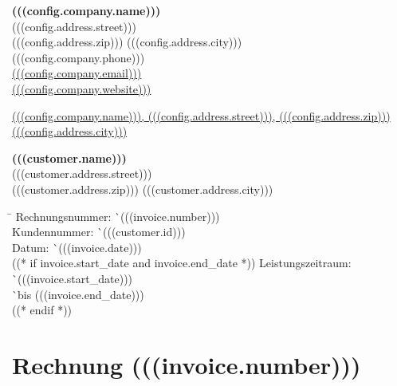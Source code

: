\documentclass[a4paper, article, oneside, hidelinks, (((config.style.font_size)))pt]{memoir}
\begin{document}
\begin{raggedleft}
	\small
	\textbf{(((config.company.name)))} \\
	(((config.address.street))) \\
	(((config.address.zip))) (((config.address.city))) \\
	(((config.company.phone))) \\
	\href{mailto:(((config.company.email)))}{(((config.company.email)))} \\
	\href{https://(((config.company.website)))}{(((config.company.website)))} \\
\end{raggedleft}

\vspace{1cm}

\begin{minipage}[t]{0.6\textwidth}
	{\scriptsize \underline{(((config.company.name))), (((config.address.street))), (((config.address.zip))) (((config.address.city)))}}

	\medskip

	{\large \textbf{(((customer.name)))}} \\
	(((customer.address.street))) \\
	(((customer.address.zip))) (((customer.address.city)))
\end{minipage}
\begin{minipage}[t]{0.4\textwidth}
	\small
	\begin{tabbing}
		\hspace{0.2\textwidth} \= \hspace{0.2\textwidth} \kill
		Rechnungsnummer: \` \hfill (((invoice.number))) \\
		Kundennummer: \` \hfill (((customer.id))) \\
		Datum: \` \hfill (((invoice.date))) \\
		((* if invoice.start_date and invoice.end_date *))
		Leistungszeitraum: \` \hfill (((invoice.start_date))) \\
		\` \hfill bis (((invoice.end_date))) \\
		((* endif *))
	\end{tabbing}
\end{minipage}

\vspace{1cm}

\chapter*{Rechnung (((invoice.number)))}
\end{document}

